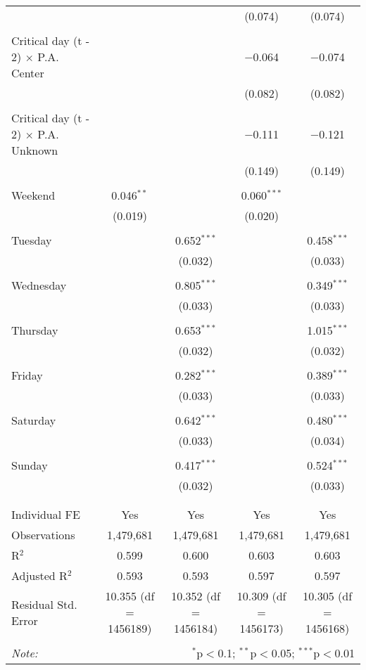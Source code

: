 \documentclass[
]{article}
\begin{document}
\begin{table}[!htbp]
{\begin{tabular}{@{\extracolsep{5pt}}lcccc}
  &  &  & (0.074) & (0.074) \\ 
  & & & & \\ 
 Critical day (t - 2) $\times$ P.A. Center &  &  & $-$0.064 & $-$0.074 \\ 
  &  &  & (0.082) & (0.082) \\ 
  & & & & \\ 
 Critical day (t - 2) $\times$ P.A. Unknown &  &  & $-$0.111 & $-$0.121 \\ 
  &  &  & (0.149) & (0.149) \\ 
  & & & & \\ 
 Weekend & 0.046$^{**}$ &  & 0.060$^{***}$ &  \\ 
  & (0.019) &  & (0.020) &  \\ 
  & & & & \\ 
 Tuesday &  & 0.652$^{***}$ &  & 0.458$^{***}$ \\ 
  &  & (0.032) &  & (0.033) \\ 
  & & & & \\ 
 Wednesday &  & 0.805$^{***}$ &  & 0.349$^{***}$ \\ 
  &  & (0.033) &  & (0.033) \\ 
  & & & & \\ 
 Thursday &  & 0.653$^{***}$ &  & 1.015$^{***}$ \\ 
  &  & (0.032) &  & (0.032) \\ 
  & & & & \\ 
 Friday &  & 0.282$^{***}$ &  & 0.389$^{***}$ \\ 
  &  & (0.033) &  & (0.033) \\ 
  & & & & \\ 
 Saturday &  & 0.642$^{***}$ &  & 0.480$^{***}$ \\ 
  &  & (0.033) &  & (0.034) \\ 
  & & & & \\ 
 Sunday &  & 0.417$^{***}$ &  & 0.524$^{***}$ \\ 
  &  & (0.032) &  & (0.033) \\ 
  & & & & \\ 
\hline \\[-1.8ex] 
Individual FE & Yes & Yes & Yes & Yes \\ 
Observations & 1,479,681 & 1,479,681 & 1,479,681 & 1,479,681 \\ 
R$^{2}$ & 0.599 & 0.600 & 0.603 & 0.603 \\ 
Adjusted R$^{2}$ & 0.593 & 0.593 & 0.597 & 0.597 \\ 
Residual Std. Error & 10.355 (df = 1456189) & 10.352 (df = 1456184) & 10.309 (df = 1456173) & 10.305 (df = 1456168) \\ 
\hline 
\hline \\[-1.8ex] 
\textit{Note:}  & \multicolumn{4}{r}{$^{*}$p$<$0.1; $^{**}$p$<$0.05; $^{***}$p$<$0.01} \\ 
\end{tabular}
} 
\end{table} 
\newpage
\end{document}
